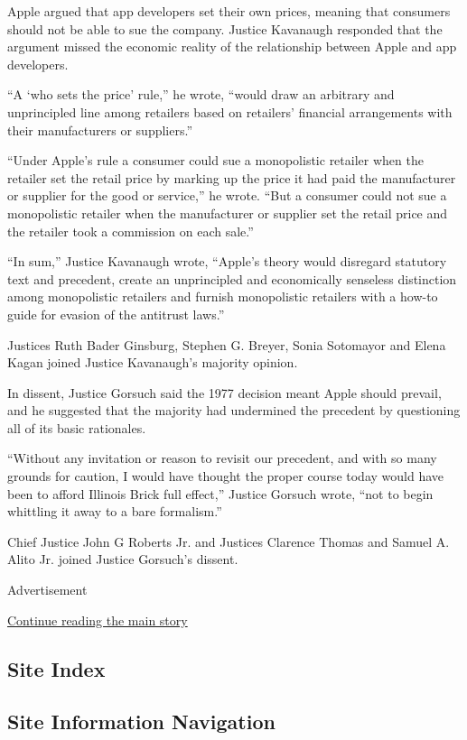 Apple argued that app developers set their own prices, meaning that
consumers should not be able to sue the company. Justice Kavanaugh
responded that the argument missed the economic reality of the
relationship between Apple and app developers.

``A `who sets the price' rule,'' he wrote, ``would draw an arbitrary and
unprincipled line among retailers based on retailers' financial
arrangements with their manufacturers or suppliers.''

``Under Apple's rule a consumer could sue a monopolistic retailer when
the retailer set the retail price by marking up the price it had paid
the manufacturer or supplier for the good or service,'' he wrote. ``But
a consumer could not sue a monopolistic retailer when the manufacturer
or supplier set the retail price and the retailer took a commission on
each sale.''

``In sum,'' Justice Kavanaugh wrote, ``Apple's theory would disregard
statutory text and precedent, create an unprincipled and economically
senseless distinction among monopolistic retailers and furnish
monopolistic retailers with a how-to guide for evasion of the antitrust
laws.''

Justices Ruth Bader Ginsburg, Stephen G. Breyer, Sonia Sotomayor and
Elena Kagan joined Justice Kavanaugh's majority opinion.

In dissent, Justice Gorsuch said the 1977 decision meant Apple should
prevail, and he suggested that the majority had undermined the precedent
by questioning all of its basic rationales.

``Without any invitation or reason to revisit our precedent, and with so
many grounds for caution, I would have thought the proper course today
would have been to afford Illinois Brick full effect,'' Justice Gorsuch
wrote, ``not to begin whittling it away to a bare formalism.''

Chief Justice John G Roberts Jr. and Justices Clarence Thomas and Samuel
A. Alito Jr. joined Justice Gorsuch's dissent.

Advertisement

\protect\hyperlink{after-bottom}{Continue reading the main story}

\hypertarget{site-index}{%
\subsection{Site Index}\label{site-index}}

\hypertarget{site-information-navigation}{%
\subsection{Site Information
Navigation}\label{site-information-navigation}}

